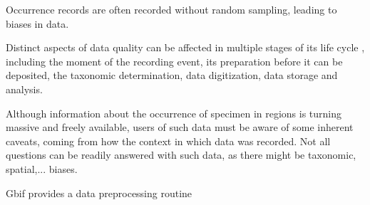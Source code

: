 Occurrence records are often recorded without random sampling, leading to biases in data.


Distinct aspects of data quality can be affected in multiple stages of its life cycle \cite{Chapman2005}, including the moment of the recording event, its preparation before it can be deposited, the taxonomic determination, data digitization, data storage and analysis.


 


Although information about the occurrence of specimen in regions is turning massive and freely available, users of such data must be aware of some inherent caveats, coming from how the context in which data was recorded. 
Not all questions can be readily answered with such data, as there might be taxonomic, spatial,... biases.





Gbif provides a data preprocessing routine %









